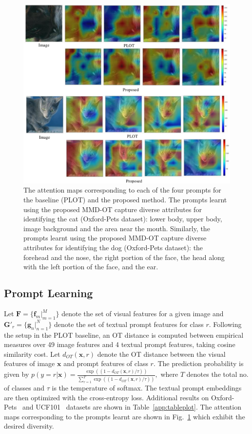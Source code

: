 \begin{figure}[t]
    \centering
    \includegraphics[scale=0.5]{chapter-1/images/PLOT-APP.pdf}   
    \caption{The attention maps corresponding to each of the four prompts for the baseline (PLOT) and the proposed method. The prompts learnt using the proposed MMD-OT capture diverse attributes for identifying the cat (Oxford-Pets dataset): lower body, upper body, image background and the area near the mouth. Similarly, the prompts learnt using the proposed MMD-OT capture diverse attributes for identifying the dog (Oxford-Pets dataset): the forehead and the nose, the right portion of the face, the head along with the left portion of the face, and the ear.
    }
    \label{fig:prompt-cat}
\end{figure}
\subsection{Prompt Learning}\label{app:prompt}
Let $\mathbf{F}=\{\mathbf{f}_m|_{m=1}^M\}$ denote the set of visual features for a given image and $\mathbf{G}'_r=\{\mathbf{g}_n|_{n=1}^N\}$ denote the set of textual prompt features for class $r$. Following the setup in the PLOT baseline, an OT distance is computed between empirical measures over 49 image features and 4 textual prompt features, taking cosine similarity cost. Let $d_{OT}(\mathbf{x}, r)$ denote the OT distance between the visual features of image $\mathbf{x}$ and prompt features of class $r$. The prediction probability is given by
$
    p(y=r|\mathbf{x}) = \frac{\exp{\left((1-d_{OT}(\mathbf{x}, r)/\tau)\right)}}{\sum_{r=1}^T\exp{\left((1-d_{OT}(\mathbf{x}, r)/\tau)\right)}},
$ where $T$ denotes the total no. of classes and $\tau$ is the temperature of softmax. The textual prompt embeddings are then optimized with the cross-entropy loss. Additional results on Oxford-Pets~\citep{oxp} and UCF101~\citep{DBLP:journals/corr/abs-1212-0402} datasets are shown in Table~\ref{app:tableplot}. The attention maps corresponding to the prompts learnt are shown in Fig.~\ref{fig:prompt-cat} which exhibit the desired diversity.

